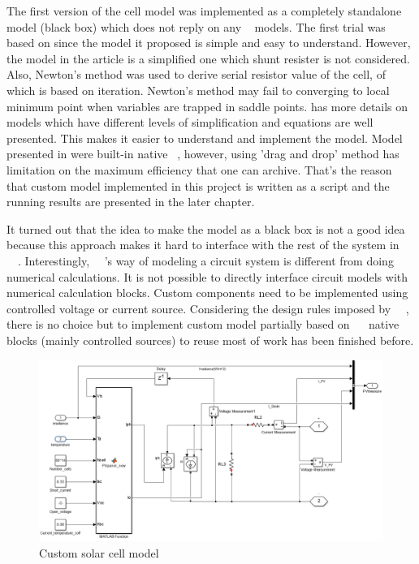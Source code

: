 The first version of the cell model was implemented as a completely standalone model (black box) which does not reply on any \simulink~ models. The first trial was based on \cite{RN26} since the model it proposed is simple and easy to understand. However, the model in the article is a simplified one which shunt resister is not considered. Also, Newton's method was used to derive serial resistor value of the cell, of which is based on iteration. Newton's method may fail to converging to local minimum point when variables are trapped in saddle points. 
\cite{RN24} has more details on models which have different levels of simplification and equations are well presented. This makes it easier to understand and implement the model. Model presented in \cite{RN24} were built-in native \simulink~, however, using 'drag and drop' method has limitation on the maximum efficiency that one can archive. That's the reason that custom model implemented in this project is written as a script and the running results are presented in the later chapter.

It turned out that the idea to make the model as a black box is not a good idea because this approach makes it hard to interface with the rest of the system in \simulink~~. Interestingly, \simulink~~'s way of modeling a circuit system is different from doing numerical calculations. It is not possible to directly interface circuit models with numerical calculation blocks. Custom components need to be implemented using controlled voltage or current source. Considering the design rules imposed by \simulink~~, there is no choice but to implement custom model partially based on \simulink~~ native blocks (mainly controlled sources) to reuse most of work has been finished before. 
\begin{figure}[h]
     \centering
     \includegraphics[width = 1\textwidth]{figures/custome_pv}
     \caption{Custom solar cell model}
     \label{fig:cell_model}
\end{figure}

